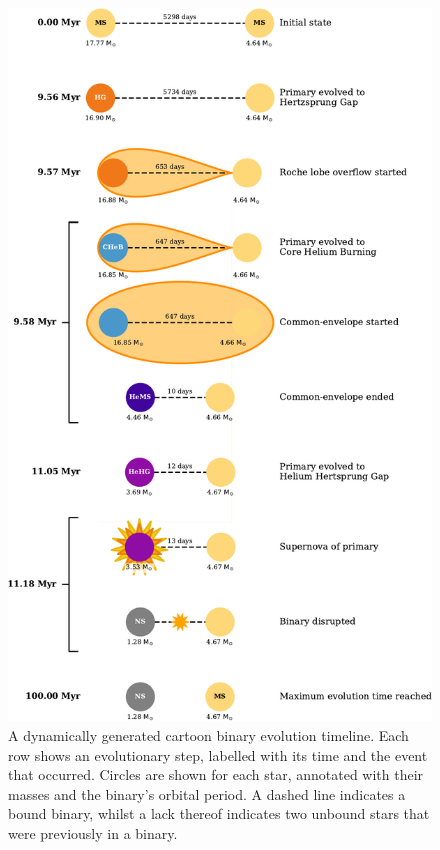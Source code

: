 \documentclass[twocolumn, twocolappendix, oneside, linenumbers]{aastex631}
\begin{document}
\begin{figure}
    \centering
    \includegraphics[width=\columnwidth]{figures/example_cartoon.pdf}
    \caption{A dynamically generated cartoon binary evolution timeline. Each row shows an evolutionary step, labelled with its time and the event that occurred. Circles are shown for each star, annotated with their masses and the binary's orbital period. A dashed line indicates a bound binary, whilst a lack thereof indicates two unbound stars that were previously in a binary.}
    \label{fig:cartoon-binary}
\end{figure}
\end{document}
